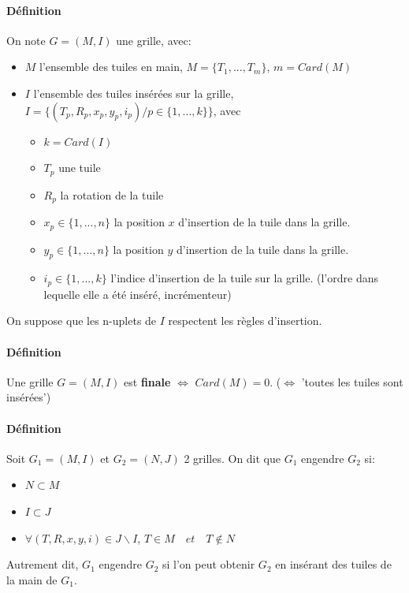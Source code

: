 \documentclass[10pt]{article}
\begin{document}
	\paragraph{Définition}
	On note $G = (M, I)$ une grille, avec:
	\begin{itemize}[label=-]
	  \item $M$ l'ensemble des tuiles en main, $M = \{T_1, ..., T_m\}$, $m = Card(M)$
	  \item $I$ l'ensemble des tuiles insérées sur la grille, $I = \{(T_p, R_p, x_p, y_p, i_p) \slash p \in \{1, ..., k\}\}$, avec
	    \begin{itemize}[label=.]
	      \item $k = Card(I)$
	      \item $T_p$ une tuile
	      \item $R_p$ la rotation de la tuile
	      \item $x_p \in \{1, ..., n\}$ la position $x$ d'insertion de la tuile dans la grille.
	      \item $y_p \in \{1, ..., n\}$ la position $y$ d'insertion de la tuile dans la grille.
	      \item $i_p \in \{1, ..., k\}$ l'indice d'insertion de la tuile sur la grille. (l'ordre dans lequelle elle a été inséré, incrémenteur)
	    \end{itemize}
	\end{itemize}
	On suppose que les n-uplets de $I$ respectent les règles d'insertion.    
	\paragraph{Définition} Une grille $G = (M, I)$ est \textbf{finale} $\Leftrightarrow$ $Card(M) = 0$.
	($\Leftrightarrow$ 'toutes les tuiles sont insérées')
	\paragraph{Définition} Soit $G_1 = (M, I)$ et $G_2 = (N, J)$ 2 grilles.
	On dit que $G_1$ engendre $G_2$ si:
	  \begin{itemize}[label=-]
	    \item $N \subset M$
	    \item $I \subset J$
	    \item $\forall (T, R, x, y, i) \in J \backslash I$, \quad $T \in M \quad et \quad T \notin N$
	  \end{itemize}
	Autrement dit, $G_1$ engendre $G_2$ si l'on peut obtenir $G_2$ en insérant des tuiles de la main de $G_1$.
	
\end{document}
